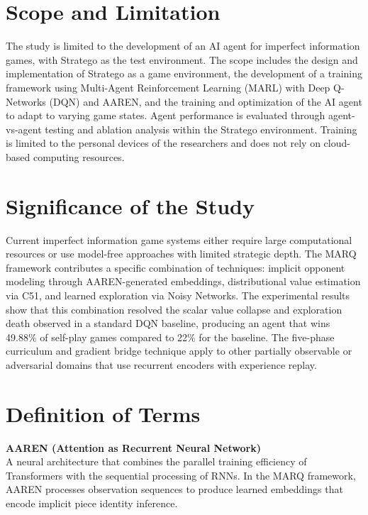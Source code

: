 \section{Scope and Limitation}

The study is limited to the development of an AI agent for imperfect information games, with Stratego as the test environment. The scope includes the design and implementation of Stratego as a game environment, the development of a training framework using Multi-Agent Reinforcement Learning (MARL) with Deep Q-Networks (DQN) and AAREN, and the training and optimization of the AI agent to adapt to varying game states. Agent performance is evaluated through agent-vs-agent testing and ablation analysis within the Stratego environment. Training is limited to the personal devices of the researchers and does not rely on cloud-based computing resources.

\section{Significance of the Study}
Current imperfect information game systems either require large computational resources or use model-free approaches with limited strategic depth. The MARQ framework contributes a specific combination of techniques: implicit opponent modeling through AAREN-generated embeddings, distributional value estimation via C51, and learned exploration via Noisy Networks. The experimental results show that this combination resolved the scalar value collapse and exploration death observed in a standard DQN baseline, producing an agent that wins 49.88\% of self-play games compared to 22\% for the baseline. The five-phase curriculum and gradient bridge technique apply to other partially observable or adversarial domains that use recurrent encoders with experience replay.

\section{Definition of Terms}

\noindent\textbf{AAREN (Attention as Recurrent Neural Network)} \\
A neural architecture that combines the parallel training efficiency of Transformers with the sequential processing of RNNs. In the MARQ framework, AAREN processes observation sequences to produce learned embeddings that encode implicit piece identity inference. \\[6pt]

